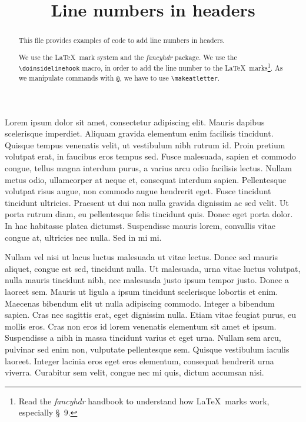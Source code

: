 \documentclass{scrartcl}
\begin{document}
\begin{english}
\date{}
\title{Line numbers in headers}
\maketitle
\begin{abstract}
This file provides examples of code to add line numbers in headers.

We use the \LaTeX\ mark system and the \emph{fancyhdr} package.
We use the \verb+\doinsidelinehook+ macro, in order to add the line number to the \LaTeX\ marks\footnote{Read the \emph{fancyhdr} handbook to understand how \LaTeX\ marks work, especially §~9.}. As we manipulate commands with \verb+@+, we have to use \verb+\makeatletter+.

\end{abstract}
\end{english}


\beginnumbering
\autopar

Lorem ipsum dolor sit amet, consectetur adipiscing elit. Mauris dapibus scelerisque imperdiet. Aliquam gravida elementum enim facilisis tincidunt. Quisque tempus venenatis velit, ut vestibulum nibh rutrum id. Proin pretium volutpat erat, in faucibus eros tempus sed. Fusce malesuada, sapien et commodo congue, tellus magna interdum purus, a varius arcu odio facilisis lectus. Nullam metus odio, ullamcorper at neque et, consequat interdum sapien. Pellentesque volutpat risus augue, non commodo augue hendrerit eget. Fusce tincidunt tincidunt ultricies. Praesent ut dui non nulla gravida dignissim ac sed velit. Ut porta rutrum diam, eu pellentesque felis tincidunt quis. Donec eget porta dolor. In hac habitasse platea dictumst. Suspendisse mauris lorem, convallis vitae congue at, ultricies nec nulla. Sed in mi mi.

Nullam vel nisi ut lacus luctus malesuada ut vitae lectus. Donec sed mauris aliquet, congue est sed, tincidunt nulla. Ut malesuada, urna vitae luctus volutpat, nulla mauris tincidunt nibh, nec malesuada justo ipsum tempor justo. Donec a laoreet sem. Mauris ut ligula a ipsum tincidunt scelerisque lobortis et enim. Maecenas bibendum elit ut nulla adipiscing commodo. Integer a bibendum sapien. Cras nec sagittis erat, eget dignissim nulla. Etiam vitae feugiat purus, eu mollis eros. Cras non eros id lorem venenatis elementum sit amet et ipsum. Suspendisse a nibh in massa tincidunt varius et eget urna. Nullam sem arcu, pulvinar sed enim non, vulputate pellentesque sem. Quisque vestibulum iaculis laoreet. Integer lacinia eros eget eros elementum, consequat hendrerit urna viverra. Curabitur sem velit, congue nec mi quis, dictum accumsan nisi.
\end{document}
